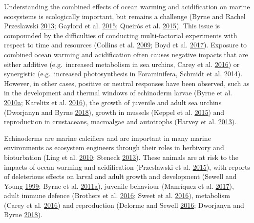 \documentclass[a4paper,10pt, oneside]{memoir}
\begin{document}
Understanding the combined effects of ocean warming and acidification on marine ecosystems is ecologically important, but remains a challenge (Byrne and Rachel Przeslawski \protect\hyperlink{ref-Byrne2013a}{2013}; Gaylord et al. \protect\hyperlink{ref-Gaylord2015}{2015}; Queirós et al. \protect\hyperlink{ref-Queiros2015}{2015}).
This issue is compounded by the difficulties of conducting multi-factorial experiments with respect to time and resources (Collins et al. \protect\hyperlink{ref-Collins2009}{2009}; Boyd et al. \protect\hyperlink{ref-Boyd2017}{2017}).
Exposure to combined ocean warming and acidification often causes negative impacts that are either additive (e.g.~increased metabolism in sea urchins, Carey et al. \protect\hyperlink{ref-Carey2016}{2016}) or synergistic (e.g.~increased photosynthesis in Foraminifera, Schmidt et al. \protect\hyperlink{ref-Schmidt2014}{2014}).
However, in other cases, positive or neutral responses have been observed, such as in the development and thermal windows of echinoderm larvae (Byrne et al. \protect\hyperlink{ref-Byrne2010}{2010}\protect\hyperlink{ref-Byrne2010}{a}; Karelitz et al. \protect\hyperlink{ref-Karelitz2016}{2016}), the growth of juvenile and adult sea urchins (Dworjanyn and Byrne \protect\hyperlink{ref-Dworjanyn2018}{2018}), growth in mussels (Keppel et al. \protect\hyperlink{ref-Keppel2015}{2015}) and reproduction in crustaceans, macroalgae and autotrophs (Harvey et al. \protect\hyperlink{ref-Harvey2013}{2013}).

Echinoderms are marine calcifiers and are important in many marine environments as ecosystem engineers through their roles in herbivory and bioturbation (Ling et al. \protect\hyperlink{ref-Ling2010}{2010}; Steneck \protect\hyperlink{ref-Steneck2013}{2013}).
These animals are at risk to the impacts of ocean warming and acidification (Przeslawski et al. \protect\hyperlink{ref-Przeslawski2015}{2015}), with reports of deleterious effects on larval and adult growth and development (Sewell and Young \protect\hyperlink{ref-Sewell1999}{1999}; Byrne et al. \protect\hyperlink{ref-Byrne2011}{2011}\protect\hyperlink{ref-Byrne2011}{a}), juvenile behaviour (Manríquez et al. \protect\hyperlink{ref-Manriquez2017}{2017}), adult immune defence (Brothers et al. \protect\hyperlink{ref-Brothers2016}{2016}; Sweet et al. \protect\hyperlink{ref-Sweet2016}{2016}), metabolism (Carey et al. \protect\hyperlink{ref-Carey2016}{2016}) and reproduction (Delorme and Sewell \protect\hyperlink{ref-Delorme2016}{2016}; Dworjanyn and Byrne \protect\hyperlink{ref-Dworjanyn2018}{2018}).
\end{document}
